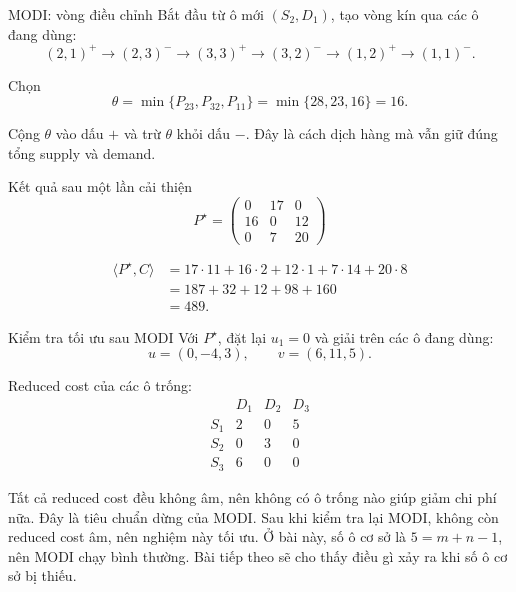 \documentclass[10pt]{beamer}
\begin{document}
\begin{frame}{MODI: vòng điều chỉnh}
    Bắt đầu từ ô mới $(S_2,D_1)$, tạo vòng kín qua các ô đang dùng:
    \[
    (2,1)^+ \to (2,3)^- \to (3,3)^+ \to (3,2)^-
    \to (1,2)^+ \to (1,1)^-.
    \]

    Chọn
    \[
        \theta=\min\{P_{23},P_{32},P_{11}\}
        =\min\{28,23,16\}=16.
    \]

    Cộng $\theta$ vào dấu $+$ và trừ $\theta$ khỏi dấu $-$.
    Đây là cách dịch hàng mà vẫn giữ đúng tổng supply và demand.
\end{frame}

\begin{frame}{Kết quả sau một lần cải thiện}
    \[
    P^\star=
    \begin{pmatrix}
    0&17&0\\
    16&0&12\\
    0&7&20
    \end{pmatrix}
    \]

    \[
    \begin{aligned}
    \langle P^\star,C\rangle
    &=17\cdot 11+16\cdot 2+12\cdot 1+7\cdot 14+20\cdot 8\\
    &=187+32+12+98+160\\
    &=489.
    \end{aligned}
    \]

\end{frame}

\begin{frame}{Kiểm tra tối ưu sau MODI}
    Với $P^\star$, đặt lại $u_1=0$ và giải trên các ô đang dùng:
    \[
        u=(0,-4,3),\qquad v=(6,11,5).
    \]

    Reduced cost của các ô trống:
    \[
    \begin{array}{c|ccc}
        & D_1&D_2&D_3\\
        \hline
        S_1&2&0&5\\
        S_2&0&3&0\\
        S_3&6&0&0
    \end{array}
    \]

    Tất cả reduced cost đều không âm, nên không có ô trống nào giúp giảm chi phí nữa.
    Đây là tiêu chuẩn dừng của MODI.
    Sau khi kiểm tra lại MODI, không còn reduced cost âm, nên nghiệm này tối ưu.
    \vspace{0.15cm}
    Ở bài này, số ô cơ sở là $5=m+n-1$, nên MODI chạy bình thường.
    Bài tiếp theo sẽ cho thấy điều gì xảy ra khi số ô cơ sở bị thiếu.
\end{frame}
\end{document}
